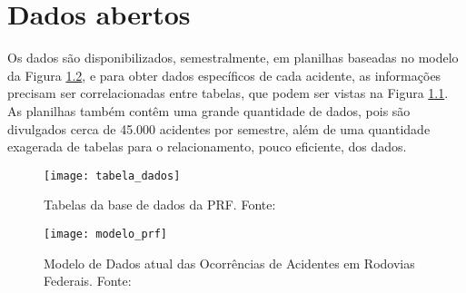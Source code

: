 \chapter{Dados abertos}

Os dados são disponibilizados, semestralmente, em planilhas baseadas no modelo da
Figura \ref{fig:modelo_prf}, e para obter dados específicos de cada acidente, as informações precisam ser
correlacionadas entre tabelas, que podem ser vistas na Figura \ref{fig:tabela_dados}. As planilhas também contêm
uma grande quantidade de dados, pois são divulgados cerca de 45.000 acidentes por semestre,
além de uma quantidade exagerada de tabelas para o relacionamento, pouco eficiente, dos
dados.

\begin{figure}[!htb]
 \centering
 \texttt{[image: tabela\_dados]}
 \caption[Tabelas da base de dados da PRF]{Tabelas da base de dados da PRF. Fonte: \cite{brasil13}}
 \label{fig:tabela_dados}
\end{figure}

\begin{figure}[!htb]
 \centering
 \texttt{[image: modelo\_prf]}
 \caption[Modelo de Dados atual das Ocorrências de Acidentes em Rodovias Federais]
  {Modelo de Dados atual das Ocorrências de Acidentes em Rodovias Federais. Fonte: \cite{brasil13}}
 \label{fig:modelo_prf}
\end{figure}

\vfill